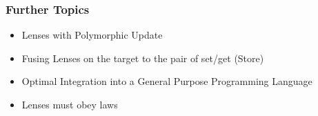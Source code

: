 \begin{frame}
\frametitle{Further Topics}

\begin{itemize}
\item Lenses with Polymorphic Update
\item Fusing Lenses on the target to the pair of set/get (Store)
\item Optimal Integration into a General Purpose Programming Language
\item Lenses must obey laws
% 
% 
\end{itemize}

\end{frame}

